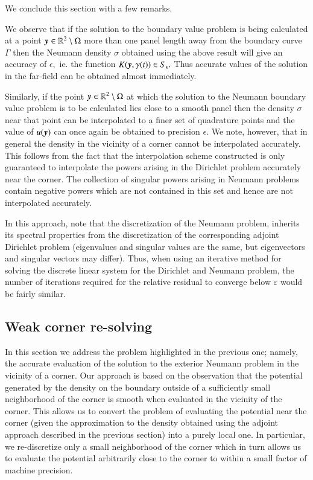 We conclude this section with a few remarks. 

\begin{remark}
\label{rem:far-field-accuracy}
We observe that if the solution to the boundary value problem is being calculated at a point $\boldsymbol{y} \in \mathbb{R}^2\setminus \Omega$ more than one panel length away from the boundary curve $\Gamma$ then the Neumann density $\sigma$ obtained using the above result will give an accuracy of $\epsilon,$ ie. the function $K(\boldsymbol{y},\gamma(t)) \in S_\epsilon.$ Thus accurate values of the solution in the far-field can be obtained almost immediately.
\end{remark}
\begin{remark}
\label{rem:strong-sol-smooth}
Similarly, if the point $\boldsymbol{y} \in \mathbb{R}^2 \setminus \Omega$ at which the solution to the Neumann boundary value problem is to be calculated lies close to a smooth panel then the density $\sigma$ near that point can be interpolated to a finer set of quadrature points and the value of $u(\boldsymbol{y})$ can once again be obtained to precision $\epsilon.$ We note, however, that in general the density in the vicinity of a corner cannot be interpolated accurately. This follows from the fact that the interpolation scheme constructed is only guaranteed to interpolate the powers arising in the Dirichlet problem accurately near the corner. The collection of singular powers arising in Neumann problems contain negative powers which are not contained in this set and hence are not interpolated accurately.
\end{remark}
{\color{blue}
\begin{remark}
In this approach, note that the discretization of the Neumann problem, inherits its spectral properties from the discretization of the corresponding adjoint Dirichlet problem (eigenvalues and singular values are the same, but eigenvectors and singular vectors may differ). Thus, when using an iterative method for solving the discrete linear system for the Dirichlet and Neumann problem, the number of iterations required for the relative residual to converge below $\varepsilon$ would be fairly similar. 
\end{remark}
}

\subsection{Weak corner re-solving \label{sec:resolve}}
In this section we address the problem highlighted in the previous one; namely, the accurate evaluation of the solution to the exterior Neumann problem in the vicinity of a corner. Our approach is based on the observation that the potential generated by the density on the boundary outside of a sufficiently small neighborhood of the corner is smooth when evaluated in the vicinity of the corner. This allows us to convert the problem of evaluating the potential near the corner (given the approximation to the density obtained using the adjoint approach described in the previous section) into a purely local one. In particular, we re-discretize only a small neighborhood of the corner which in turn allows us to evaluate the potential arbitrarily close to the corner to within a small factor of machine precision. 

